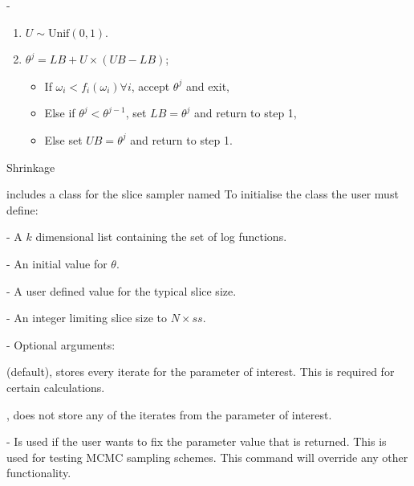 -\documentclass[article]{jss}
\begin{document}
%
\begin{algorithm}[H]
\begin{enumerate}
\item $U\sim\mbox{Unif}(0,1)$. 
\item $\theta^{j}=LB+U{\times}(UB-LB)$;

\begin{itemize}
\item If $\omega_{i}<f_{i}(\omega_{i})\forall i$, accept $\theta^{j}$
and exit, 
\item Else if $\theta^{j}<\theta^{j-1}$, set $LB=\theta^{j}$ and return
to step 1, 
\item Else set $UB=\theta^{j}$ and return to step 1. 
\end{itemize}
\end{enumerate}
\caption{Shrinkage}
\label{alg:shrinkage}
\end{algorithm}


 includes a class for the slice sampler named
To initialise the class the user must define:
\begin{description}
\item {} - A $k$ dimensional list containing the set of log
  functions.
\item {} - An initial value for $\theta$.
\item {} - A user defined value for the typical slice size.
\item {} - An integer limiting slice size to $N\times ss$.
\item {} - Optional arguments:
   
  \begin{description}
  \item {}
    \begin{description}
    \item {} (default), stores every iterate for the
      parameter of interest. This is required for certain
      calculations.
    \item {}, does not store any of the iterates from the
      parameter of interest.
    \end{description}
  \item {} - Is used if the user wants to fix the
    parameter value that is returned. This is used for testing MCMC
    sampling schemes.  This command will override any other
    functionality.
  \end{description}
\end{description}
\end{document}
